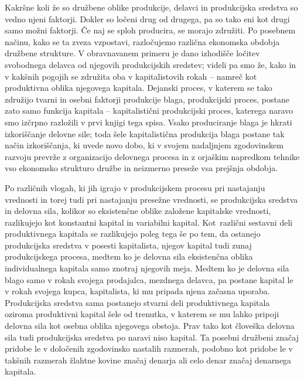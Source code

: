 \documentclass[kapital_02.tex]{subfiles}
\begin{document}
Kakršne koli že so družbene oblike produkcije, delavci in produkcijska sredstva so vedno njeni faktorji. Dokler so ločeni drug od drugega, pa so tako eni kot drugi samo možni faktorji. Če naj se sploh producira, se morajo združiti. Po posebnem načinu, kako se ta zveza vzpostavi, razločujemo različna ekonomska obdobja družbene strukture. V obravnavanem primeru je dano izhodišče ločitev svobodnega delavca od njegovih produkcijskih sredstev; videli pa smo že, kako in v kakšnih pogojih se združita oba v kapitalistovih rokah -- namreč kot produktivna oblika njegovega kapitala. Dejanski proces, v katerem se tako združijo tvarni in osebni faktorji produkcije blaga, produkcijski proces, postane zato samo funkcija kapitala -- kapitalistični produkcijski proces, katerega naravo smo izčrpno razložili v prvi knjigi tega spisa. Vsako produciranje blaga je hkrati izkoriščanje delovne sile; toda šele kapitalistična produkcija blaga postane tak način izkoriščanja, ki uvede novo dobo, ki v svojem nadaljnjem zgodovinskem razvoju prevrže z organizacijo delovnega procesa in z orjaškim napredkom tehnike vso ekonomsko strukturo družbe in neizmerno preseže vsa prejšnja obdobja.

Po različnih vlogah, ki jih igrajo v produkcijskem procesu pri nastajanju vrednosti in torej tudi pri nastajanju presežne vrednosti, se produkcijska sredstva in delovna sila, kolikor so eksistenčne oblike založene kapitalske vrednosti, razlikujejo kot konstantni kapital in variabilni kapital. Kot\KPEstran\ različni sestavni deli produktivnega kapitala se razlikujejo poleg tega še po tem, da ostanejo produkcijska sredstva v posesti kapitalista, njegov kapital tudi zunaj produkcijskega procesa, medtem ko je delovna sila eksistenčna oblika individualnega kapitala samo znotraj njegovih meja. Medtem ko je delovna sila blago samo v rokah svojega prodajalca, mezdnega delavca, pa postane kapital le v rokah svojega kupca, kapitalista, ki mu pripada njena začasna uporaba. Produkcijska sredstva sama postanejo stvarni deli produktivnega kapitala oziroma produktivni kapital šele od trenutka, v katerem se mu lahko pripoji delovna sila kot osebna oblika njegovega obstoja. Prav tako kot človeška delovna sila tudi produkcijska sredstva po naravi niso kapital. Ta posebni družbeni značaj pridobe le v določenih zgodovinsko nastalih razmerah, podobno kot pridobe le v takšnih razmerah žlahtne kovine značaj denarja ali celo denar značaj denarnega kapitala.
\end{document}
